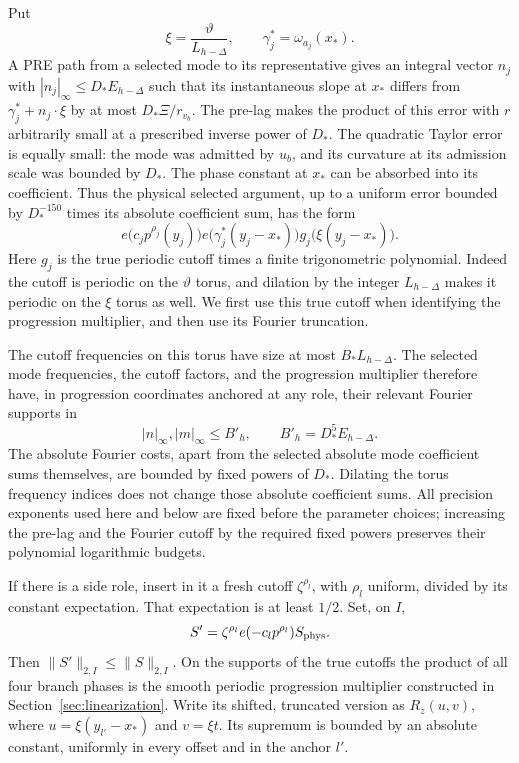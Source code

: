 Put
\[
 \xi=\frac{\vartheta}{L_{h-\Delta}},\qquad
 \gamma_j^*=\omega_{a_j}(x_*).
\]
A PRE path from a selected mode to its representative gives an integral
vector $n_j$ with $|n_j|_\infty\leq D_*E_{h-\Delta}$ such that its
instantaneous slope at $x_*$ differs from
$\gamma_j^*+n_j\cdot\xi$ by at most $D_*\Xi/r_{v_b}$.
The pre-lag makes the product of this error with $r$ arbitrarily small
at a prescribed inverse power of $D_*$.  The quadratic Taylor error is
equally small: the mode was admitted by $u_b$, and its curvature at its
admission scale was bounded by $D_*$.  The phase constant at $x_*$ can
be absorbed into its coefficient.  Thus the physical selected argument,
up to a uniform error bounded by $D_*^{-150}$ times its absolute
coefficient sum, has the form
\begin{equation*}
 e\big(c_jp^{\rho_j}(y_j)\big)
 e\big(\gamma_j^*(y_j-x_*)\big)
 g_j\big(\xi(y_j-x_*)\big).
 \tag{29}\label{eq:src-29}
\end{equation*}
Here $g_j$ is the true periodic cutoff times a finite trigonometric
polynomial.  Indeed the cutoff is periodic on the $\vartheta$ torus,
and dilation by the integer $L_{h-\Delta}$ makes it periodic on the
$\xi$ torus as well.  We first use this true cutoff when identifying
the progression multiplier, and then use its Fourier truncation.

The cutoff frequencies on this torus have size at most
$B_*L_{h-\Delta}$.  The selected mode frequencies, the cutoff factors,
and the progression multiplier therefore have, in progression
coordinates anchored at any role, their relevant Fourier supports in
\[
 |n|_\infty,|m|_\infty\leq B'_h,
 \qquad B'_h=D_*^5E_{h-\Delta}.
\]
The absolute Fourier costs, apart from the selected absolute mode
coefficient sums themselves, are bounded by fixed powers of $D_*$.
Dilating the torus frequency indices does not change those absolute
coefficient sums.  All precision exponents used here and below are
fixed before the parameter choices; increasing the pre-lag and the
Fourier cutoff by the required fixed powers preserves their polynomial
logarithmic budgets.

If there is a side role, insert in it a fresh cutoff
$\zeta^{\rho_l}$, with $\rho_l$ uniform, divided by its constant
expectation.  That expectation is at least $1/2$.  Set, on $I$,
\[
 S'=\zeta^{\rho_l}e(-c_lp^{\rho_l})S_{\mathrm{phys}}.
\]
Then $\|S'\|_{2,I}\leq\|S\|_{2,I}$.  On the supports of the true
cutoffs the product of all four branch phases is the smooth periodic
progression multiplier constructed in Section~\ref{sec:linearization}.
Write its shifted, truncated version as $R_z(u,v)$, where
$u=\xi(y_{l'}-x_*)$ and $v=\xi t$.  Its supremum is bounded by an
absolute constant, uniformly in every offset and in the anchor $l'$.

